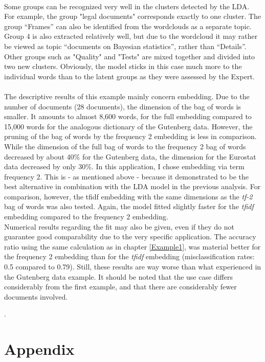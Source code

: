 \documentclass[11pt,a4paper]{article}
\begin{document}
\ \\
Some groups can be recognized very well in the clusters detected by the LDA. For example, the group "legal documents" corresponds exactly to one cluster. The group “Frames” can also be identified from the wordclouds as a separate topic. Group 4 is also extracted relatively well, but due to the wordcloud it may rather be viewed as topic “documents on Bayesian statistics”, rather than “Details”. Other groups such as "Quality" and "Tests" are mixed together and divided into two new clusters. Obviously, the model sticks in this case much more to the individual words than to the latent groups as they were assessed by the Expert.\\
\ \\
The descriptive results of this example mainly concern embedding. Due to the number of documents (28 documents), the dimension of the bag of words is smaller. It amounts to almost 8,600 words, for the full embedding compared to 15,000 words for the analogous dictionary of the Gutenberg data. However, the pruning of the bag of words by the frequency 2 embedding is less in comparison. While the dimension of the full bag of words to the frequency 2 bag of words decreased by about 40\% for the Gutenberg data, the dimension for the Eurostat data decreased by only 30\%. In this application, I chose embedding via term frequency 2. This is - as mentioned above - because it demonstrated to be the best alternative in combination with the LDA model in the previous analysis. For comparison, however, the tfidf embedding with the same dimensions as the \textit{tf-2} bag of words was also tested. Again, the model fitted slightly faster for the \textit{tfidf} embedding compared to the frequency 2 embedding.\\
Numerical results regarding the fit may also be given, even if they do not guarantee good comparability due to the very specific application. The accuracy ratio using the same calculation as in chapter \ref{Example1}, was material better for the frequency 2 embedding than for the \textit{tfidf} embedding (misclassification rates: 0.5 compared to 0.79). Still, these results are way worse than what experienced in the Gutenberg data example. It should be noted that the use case differs considerably from the first example, and that there are considerably fewer documents involved.





\newpage 
.
\newpage
\appendix
\section{Appendix}
	
  
  


\listoffigures
\listoftables

	
	
\end{document}
